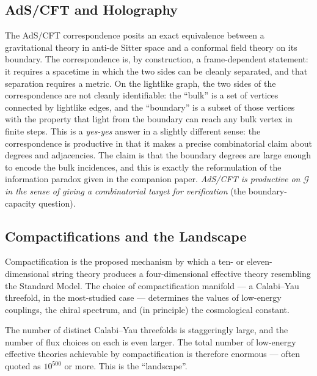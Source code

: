 \documentclass[11pt]{article}
\begin{document}
\subsection{AdS/CFT and Holography}

The AdS/CFT correspondence posits an exact equivalence between a gravitational theory in anti-de Sitter space and a conformal field theory on its boundary. The correspondence is, by construction, a frame-dependent statement: it requires a spacetime in which the two sides can be cleanly separated, and that separation requires a metric. On the lightlike graph, the two sides of the correspondence are not cleanly identifiable: the ``bulk'' is a set of vertices connected by lightlike edges, and the ``boundary'' is a subset of those vertices with the property that light from the boundary can reach any bulk vertex in finite steps. This is a \emph{yes-yes} answer in a slightly different sense: the correspondence is productive in that it makes a precise combinatorial claim about degrees and adjacencies. The claim is that the boundary degrees are large enough to encode the bulk incidences, and this is exactly the reformulation of the information paradox given in the companion paper. \emph{AdS/CFT is productive on $\mathcal{G}$ in the sense of giving a combinatorial target for verification} (the boundary-capacity question).

\subsection{Compactifications and the Landscape}

Compactification is the proposed mechanism by which a ten- or eleven-dimensional string theory produces a four-dimensional effective theory resembling the Standard Model. The choice of compactification manifold --- a Calabi--Yau threefold, in the most-studied case --- determines the values of low-energy couplings, the chiral spectrum, and (in principle) the cosmological constant.

The number of distinct Calabi--Yau threefolds is staggeringly large, and the number of flux choices on each is even larger. The total number of low-energy effective theories achievable by compactification is therefore enormous --- often quoted as $10^{500}$ or more. This is the ``landscape''.
\end{document}
